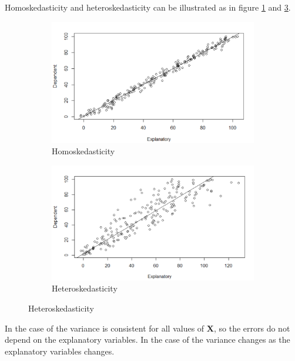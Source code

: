 Homoskedasticity and heteroskedasticity can be illustrated as in figure \ref{fig:homo_with_dependent_up_axis} and \ref{fig:hetero_with_dependent_up_axis}. 
\begin{figure}[H]
\centering
\begin{subfigure}[b]{0.5\textwidth}
    \centering
    \includegraphics[width = \textwidth]{figures/Thea/homoplot.png}
    \caption{Homoskedasticity}
    \label{fig:homo_with_dependent_up_axis}
\end{subfigure}%
\begin{subfigure}[b]{0.5\textwidth}
\centering
    \includegraphics[width = \textwidth]{figures/Thea/Heteroplot.png}
    \caption{Heteroskedasticity}
    \label{fig:hetero_with_dependent_up_axis}
\end{subfigure}
\end{figure}
In the case of \homo  the variance is consistent for all values of $\mathbf{X}$, so the errors do not depend on the explanatory variables.
In the case of \hetero the variance changes as the explanatory variables changes. 

